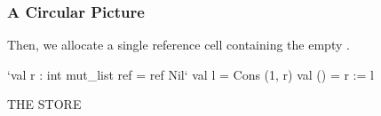 \documentclass[aspectratio=169]{beamer}
\newcommand{\topthing}[2]{
      \begin{minipage}[t][#1][t]{\textwidth}
        \vspace{\fill}
        #2
        \vspace{\fill}
      \end{minipage}
    }
\begin{document}
\begin{frame}[fragile]
  \frametitle{A Circular Picture}

  \topthing{0.2in}{
    Then, we allocate a single reference cell containing the empty \code{mut_list}.
  }

  \vspace{10pt}

  \begin{center}
    \begin{minipage}[t][2.1in][t]{0.55\textwidth}
      \vspace{\fill}
      \small
      \begin{codeblock}
        `val r : int mut_list ref = ref Nil`
        val l = Cons (1, r)
        val () = r := l
      \end{codeblock}
      \vspace{\fill}
    \end{minipage}
    \hfill\vline\hfill
    \begin{minipage}[t][2.1in][t]{0.35\textwidth}
      \centering
      {\hspace{-20pt}\color{gray} \large THE STORE}

      \vspace{\fill}
      \vspace{\fill}
    \end{minipage}
  \end{center}
\end{frame}
\end{document}
